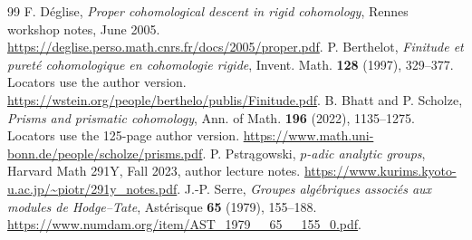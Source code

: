 \documentclass[11pt]{article}
\theoremstyle{definition}\newtheorem{definition}[theorem]{Definition}
\theoremstyle{remark}\newtheorem{remark}[theorem]{Remark}
\begin{document}
\begin{thebibliography}{99}
 F. D\'eglise, \emph{Proper cohomological descent in rigid cohomology}, Rennes workshop notes, June 2005. \url{https://deglise.perso.math.cnrs.fr/docs/2005/proper.pdf}.
 P. Berthelot, \emph{Finitude et puret\'e cohomologique en cohomologie rigide}, Invent. Math. \textbf{128} (1997), 329--377. Locators use the author version. \url{https://wstein.org/people/berthelo/publis/Finitude.pdf}.
 B. Bhatt and P. Scholze, \emph{Prisms and prismatic cohomology}, Ann. of Math. \textbf{196} (2022), 1135--1275. Locators use the 125-page author version. \url{https://www.math.uni-bonn.de/people/scholze/prisms.pdf}.
 P. Pstr\k{a}gowski, \emph{$p$-adic analytic groups}, Harvard Math 291Y, Fall 2023, author lecture notes. \url{https://www.kurims.kyoto-u.ac.jp/~piotr/291y_notes.pdf}.
 J.-P. Serre, \emph{Groupes alg\'ebriques associ\'es aux modules de Hodge--Tate}, Ast\'erisque \textbf{65} (1979), 155--188. \url{https://www.numdam.org/item/AST_1979__65__155_0.pdf}.


\end{thebibliography}
\end{document}
